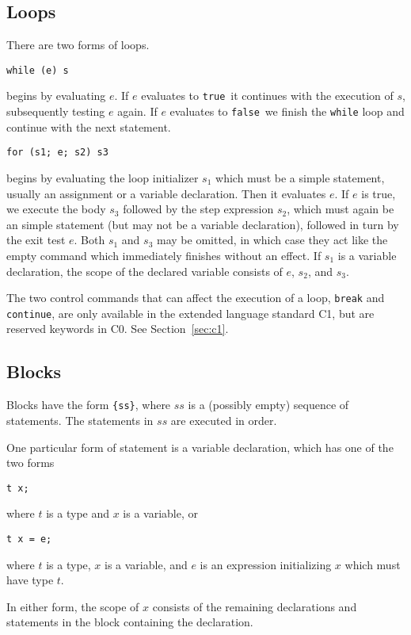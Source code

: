 \documentclass[11pt]{article}
\newcommand{\vtrue}{\texttt{true}}
\newcommand{\vfalse}{\texttt{false}}
\begin{document}
\subsection{Loops}

There are two forms of loops.
\begin{lstlisting}
while (e) s
\end{lstlisting}
begins by evaluating $e$.  If $e$ evaluates to \vtrue\ it
continues with the execution of $s$, subsequently testing $e$
again.  If $e$ evaluates to \vfalse\ we finish the \lstinline'while'
loop and continue with the next statement.
\begin{lstlisting}
for (s1; e; s2) s3
\end{lstlisting}
begins by evaluating the loop initializer $s_1$ which must be a simple
statement, usually an assignment or a variable declaration.  Then it
evaluates $e$.  If $e$ is true, we execute the body $s_3$ followed by
the step expression $s_2$, which must again be an simple statement
(but may not be a variable declaration), followed in turn by the exit
test $e$.  Both $s_1$ and $s_3$ may be omitted, in which case they act
like the empty command which immediately finishes without an effect.
If $s_1$ is a variable declaration, the scope of the declared variable
consists of $e$, $s_2$, and $s_3$.

The two control commands that can affect the execution of a
loop, \lstinline'break' and \lstinline'continue', are only available
in the extended language standard C1, but are reserved
keywords in C0.  See Section~\ref{sec:c1}.

\subsection{Blocks}

Blocks have the form \lstinline'{ss}', where $ss$ is a (possibly empty)
sequence of statements.  The statements in $ss$ are executed in order.

One particular form of statement is a variable declaration, which has
one of the two forms
\begin{lstlisting}
t x;
\end{lstlisting}
where $t$ is a type and $x$ is a variable, or
\begin{lstlisting}
t x = e;
\end{lstlisting}
where $t$ is a type, $x$ is a variable, and $e$ is
an expression initializing $x$ which must have type $t$.

In either form, the scope of $x$ consists of the remaining
declarations and statements in the block containing the
declaration.
\end{document}
